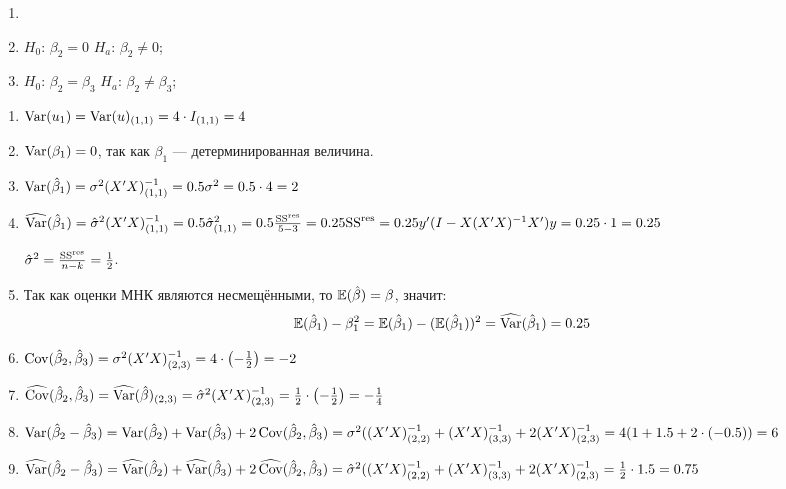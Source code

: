 \begin{problem}

\begin{enumerate}[resume]
\item {} 
\item {}  $H_0$: $\beta_2 = 0$  $H_a$: $\beta_2 \neq 0$;
\item {}  $H_0$: $\beta_2 = \beta_3$  $H_a$: $\beta_2 \neq \beta_3$;
\end{enumerate}


\begin{sol}
\begin{enumerate}
\item $\Var(u_1)=\Var(u)_{(1,1)}=4\cdot I_{(1,1)}=4$
\item $\Var(\beta_1)=0$, так как $\beta_1$ — детерминированная величина.
\item $\Var(\hb_1)=\sigma^2(X'X)^{-1}_{(1,1)}=0.5\sigma^2=0.5\cdot 4=2$
\item $\hVar(\hb_1)=\hat\sigma^2(X'X)^{-1}_{(1,1)}=0.5\hat\sigma^2_{(1,1)}=0.5\frac{\SSR}{5-3}=0.25\SSR=0.25y'(I-X(X'X)^{-1}X')y=0.25\cdot 1=0.25$

$\hat\sigma^2=\frac{\SSR}{n-k}=\frac12$.

\item Так как оценки МНК являются несмещёнными, то $\E(\hb)=\beta$, значит:
\[
\E(\hb_1)-\beta_1^2=\E(\hb_1)-(\E(\hb_1))^2=\hVar(\hb_1)=0.25
\]

\item $\Cov(\hb_2,\hb_3)=\sigma^2(X'X)^{-1}_{(2,3)}=4\cdot\left(-\frac12\right)=-2$
\item $\hCov(\hb_2,\hb_3)=\hVar(\hat\beta)_{(2,3)}=\hat\sigma^2(X'X)^{-1}_{(2,3)}=\frac{1}{2}\cdot\left(-\frac12\right)=-\frac14$

\item $\Var(\hb_2-\hb_3)=\Var(\hb_2)+\Var(\hb_3)+2\Cov(\hb_2,\hb_3)=\sigma^2((X'X)^{-1}_{(2,2)}+(X'X)^{-1}_{(3,3)}+2(X'X)^{-1}_{(2,3)}=4(1+1.5+2\cdot(-0.5))=6$

\item $\hVar(\hb_2-\hb_3)=\hVar(\hb_2)+\hVar(\hb_3)+2\hCov(\hb_2,\hb_3)=\hat\sigma^2((X'X)^{-1}_{(2,2)}+(X'X)^{-1}_{(3,3)}+2(X'X)^{-1}_{(2,3)}=\frac{1}{2}\cdot1.5=0.75$


\end{enumerate}
\end{sol}
\end{problem}
